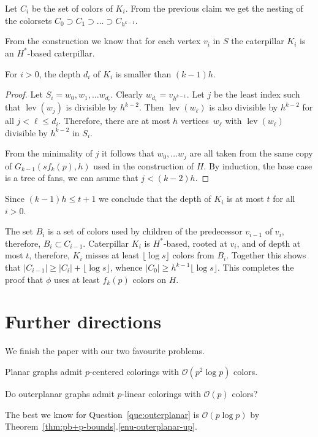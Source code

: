 Let $C_i$ be the set of colors of $K_i$. From the previous claim
we get the nesting of the colorsets
$C_0\supset C_1 \supset \ldots \supset C_{h^{k-1}}$.

{}From the construction we know that for each vertex $v_i$ in $S$ the caterpillar $K_i$ is an $H^*$-based
caterpillar.
\begin{klaim}
  For $i>0$, the depth $d_i$ of $K_{i}$ is smaller than $(k-1)h$.
\end{klaim}

\begin{proof}
  Let $S_i =w_0,w_1,\ldots w_{d_i}$. Clearly $w_{d_i}=v_{h^{k-1}}$.  Let
  $j$ be the least index such that $\operatorname{lev}(w_j)$ is divisible by $h^{k-2}$.
  Then $\operatorname{lev}(w_\ell)$ is also divisible by $h^{k-2}$ for all $j < \ell \leq d_i$.
  Therefore, there are at most $h$ vertices~$w_\ell$ with $\operatorname{lev}(w_\ell)$ divisible
  by $h^{k-2}$ in $S_i$.

  {}From the minimality of $j$ it follows that $w_0,\ldots w_{j}$
  are all taken from the same copy of $G_{k-1}(s f_k(p),h)$ used in the
  construction of $H$. By induction, the base case is a tree of fans,
  we can asume that $j < (k-2)h$. 
\end{proof}

Since $(k-1)h \leq t+1$
we conclude that the depth of $K_{i}$ is at most $t$ for all
$i > 0$. 

The set $B_i$ is a set of colors used by children of the predecessor $v_{i-1}$
of $v_i$, therefore, $B_i \subset C_{i-1}$. Caterpillar $K_i$ is $H^*$-based,
rooted at $v_i$, and of depth at most $t$, therefore, $K_i$ misses at
least $\lfloor\log s\rfloor$ colors from $B_i$. Together this shows that
$|C_{i-1}| \geq |C_i|+\lfloor\log s\rfloor$, whence $|C_0|\geq h^{k-1}\lfloor\log s\rfloor$.  This
completes the proof that $\phi$ uses at least $f_k(p)$ colors
on $H$.

\section{Further directions}
We finish the paper with our two favourite problems.
\begin{conjecture}
Planar graphs admit $p$-centered colorings with $\mathcal{O}(p^2\log p)$ colors.
\end{conjecture}
\begin{question}
Do outerplanar graphs admit $p$-linear colorings with $\mathcal{O}(p)$ colors? 
\label{que:outerplanar}
\end{question}
The best we know for Question~\ref{que:outerplanar} is $\mathcal{O}(p\log p)$ by Theorem~\ref{thm:pb+p-bounds}.\ref{enu-outerplanar-up}.

